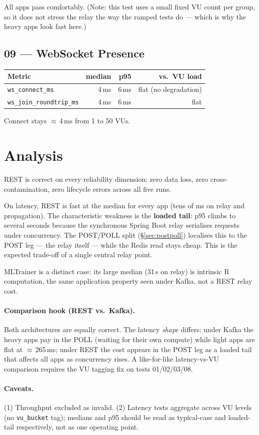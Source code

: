 \documentclass[11pt,a4paper]{article}
\begin{document}
\medskip
\noindent All apps pass comfortably. (Note: this test uses a small fixed VU
count per group, so it does not stress the relay the way the ramped tests do —
which is why the heavy apps look fast here.)

\subsection{09 — WebSocket Presence}

\begin{tabular}{@{}lrrr@{}}
\toprule
\textbf{Metric} & \textbf{median} & \textbf{p95} & \textbf{vs.\ VU load} \\
\midrule
\texttt{ws\_connect\_ms}        & 4\,ms & 6\,ms & flat (no degradation) \\
\texttt{ws\_join\_roundtrip\_ms} & 4\,ms & 6\,ms & flat \\
\bottomrule
\end{tabular}

\medskip\noindent Connect stays $\approx$\,4\,ms from 1 to 50 VUs.

\section{Analysis}

REST is correct on every reliability dimension: zero data loss, zero
cross-contamination, zero lifecycle errors across all five runs.

On latency, REST is fast at the median for every app (tens of ms on relay and
propagation). The characteristic weakness is the \textbf{loaded tail}: p95
climbs to several seconds because the synchronous Spring Boot relay serialises
requests under concurrency. The POST/POLL split (\S\ref{sec:postpoll}) localises
this to the POST leg — the relay itself — while the Redis read stays cheap.
This is the expected trade-off of a single central relay point.

MLTrainer is a distinct case: its large median (31\,s on relay) is intrinsic R
computation, the same application property seen under Kafka, not a REST relay
cost.

\paragraph{Comparison hook (REST vs.\ Kafka).} Both architectures are equally
correct. The latency \emph{shape} differs: under Kafka the heavy apps pay in
the POLL (waiting for their own compute) while light apps are flat at
$\approx$\,265\,ms; under REST the cost appears in the POST leg as a loaded
tail that affects all apps as concurrency rises. A like-for-like latency-vs-VU
comparison requires the VU tagging fix on tests 01/02/03/08.

\paragraph{Caveats.} (1) Throughput excluded as invalid. (2) Latency tests
aggregate across VU levels (no \texttt{vu\_bucket} tag); medians and p95 should
be read as typical-case and loaded-tail respectively, not as one operating
point.
\end{document}
